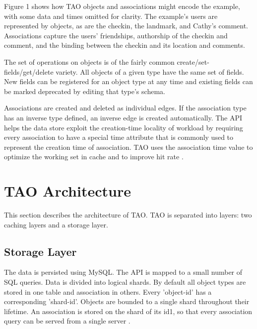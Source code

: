 \documentclass[9pt,twocolumn,twoside]{../../styles/osajnl}
\begin{document}

Figure 1  shows how TAO objects and associations might encode the example, with some data and times omitted for clarity. The example’s users are represented by objects, as are the checkin, the landmark, and Cathy’s comment. Associations capture the users’ friendships, authorship of the checkin and comment, and the binding between the checkin and its location and comments.

The set of operations on objects is of the fairly common create/set-fields/get/delete variety. All objects of a given type have the same set of fields. New fields can be registered for an object type at any time and existing fields can be marked deprecated by editing that type’s schema. 

Associations are created and deleted as individual edges. If the association type has an inverse type defined, an inverse edge is created automatically. The API helps the data store exploit the creation-time locality of workload by requiring every association to have a special time attribute that is commonly used to represent the creation time of association. TAO uses the association time value to optimize the working set in cache and to improve hit rate \cite{book-tao1}.

\section{TAO Architecture}

This section describes the architecture of TAO.  TAO is separated into layers: two caching layers and a storage layer.
\subsection{Storage Layer}

The data is persisted using MySQL. The API is mapped to a small number of SQL queries. Data is divided into logical shards. By default all object types are stored in one table and association in others. Every 'object-id' has a corresponding 'shard-id'. Objects are bounded to a single shard throughout their lifetime. An association is stored on the shard of its id1, so that every association query can be served from a single server \cite{www-tao4}.
\end{document}
